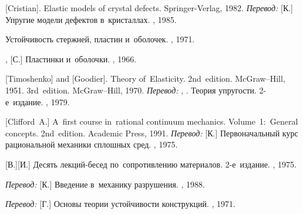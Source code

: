 \begin{thebibliography}{123}
\begin{otherlanguage}{russian}
[Cristian]. Elastic models of crystal defects. Springer\hbox{-}Verlag, 1982. 
\emph{Перевод:} [К.] Упругие модели дефектов в~кристаллах. \mirpublisher, 1985. 

Устойчивость стержней, пластин и~оболочек.
\naukapublisher, 1971.

,
[С.]
Пластинки и~оболочки.
\naukapublisher, 1966.

[Timoshenko] and [Goodier].
Theory of~Elasticity.
2nd~edition. McGraw\hbox{--}Hill, 1951. 
3rd~edition. McGraw\hbox{--}Hill, 1970. 
\emph{Перевод:}
, .
Теория упругости.
2\hbox{-}е~издание.
\naukapublisher, 1979.

[Clifford~A.] A~first course in~rational continuum mechanics. Volume~1:~General concepts. 2nd~edition. Academic Press, 1991.  %
\emph{Перевод:} [К.] Первоначальный курс рациональной механики сплошных сред. \mirpublisher, 1975. 

[В.][И.] Десять лекций\hbox{-}бесед по~сопротивлению материалов. 2\hbox{-}е~издание. \naukapublisher, 1975. 

\emph{Перевод:}
[К.]
Введение в~механику разрушения.
\mirpublisher,
1988.

\emph{Перевод:}
[Г.]
Основы теории устойчивости конструкций.
\mirpublisher, 1971.


\end{otherlanguage}
\end{thebibliography}
